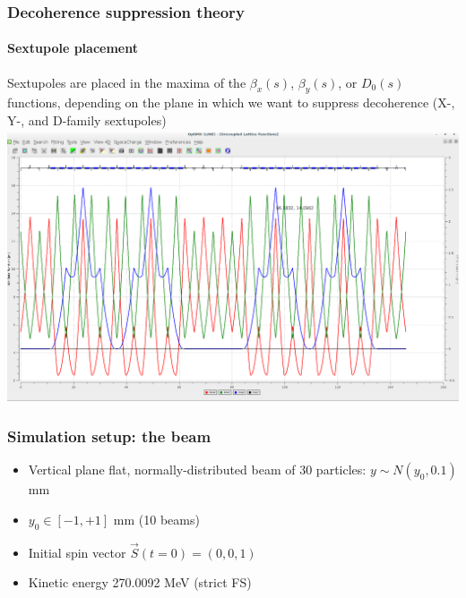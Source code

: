\documentclass{beamer}
\begin{document}
\begin{frame}\frametitle{Decoherence suppression theory}\framesubtitle{Sextupole placement}
  Sextupoles are placed in the maxima of the $\beta_x(s)$, $\beta_y(s)$, or $D_0(s)$ functions, depending on the plane in which we want to suppress decoherence (X-, Y-, and D-family sextupoles)
  \centering
  \includegraphics[width=\linewidth]{BNLFS_lattice_betas_optim}
\end{frame}

\begin{frame}\frametitle{Simulation setup: the beam}
  \begin{itemize}
  \item Vertical plane flat, normally-distributed beam of 30 particles: $y\sim N(y_0, 0.1)$ mm
  \item $y_0 \in [-1, +1]$ mm (10 beams)
  \item Initial spin vector $\vec S(t=0) = (0,0,1)$
  \item Kinetic energy 270.0092 MeV (strict FS)
  \end{itemize}
\end{frame}
\end{document}
